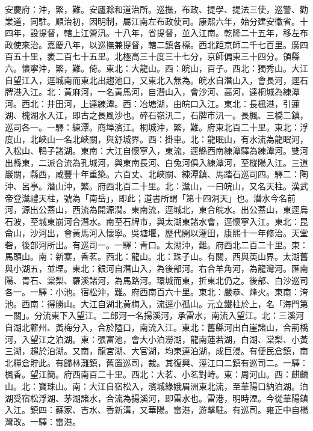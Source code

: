 \begin{pinyinscope}
安慶府：沖，繁，難。安廬滁和道治所。巡撫，布政、提學、提法三使，巡警、勸業道，同駐。順治初，因明制，屬江南左布政使司。康熙六年，始分建安徽省。十四年，設提督，轄上江營汛。十八年，省提督，並入江南。乾隆二十五年，移左布政使來治。嘉慶八年，以巡撫兼提督，轄二鎮各標。西北距京師二千七百里。廣四百五十里，袤二百七十五里。北極高三十度三十七分，京師偏東三十四分。領縣六。懷寧沖，繁，難。倚。東北：大龍山。西：皖山，百子。西北：獨秀山。大江自望江入，逕城南而東北出趨池口，又東北入無為。皖水自潛山入，會長河，逕石牌港入江。北：黃麻河，一名黃馬河，自潛山入，會沙河、高河，達桐城為練潭河。西北：井田河，上達練潭。西：冶塘湖，由皖口入江。東北：長楓港，引蓮湖、槐湖水入江，即古之長風沙也。碎石嶺汛二，石牌市汛一。長楓、三橋二鎮，巡司各一。一驛：練潭。商埠濱江。桐城沖，繁，難。府東北百二十里。東北：浮度山，北峽山一名北峽關，與舒城界。西：掛車。北：龍眠山，有水流為龍眠河，入松山、鴨子諸湖。東南：大江自懷寧入，東流，逕縣西南練潭驛為練潭河。雙河出縣東，二派合流為孔城河，與東南長河、白兔河俱入練潭河，至樅陽入江。三道巖關，縣西，咸豐十年重築。六百丈、北峽關、練潭鎮、馬踏石巡司四。驛二：陶沖、呂亭。潛山沖，繁。府西北百二十里。北：灊山，一曰皖山，又名天柱。漢武帝登灊禮天柱，號為「南岳」，即此；道書所謂「第十四洞天」也。潛水今名前河，源出公蓋山，西流為開源澗。東南流，逕城北，東合皖水。出公蓋山，東逕烏石波，至城東崩河合潛水。南至石牌市，與太湖東諸水會，逕懷寧入江。東北：昆侖山，沙河出，會黃馬河入懷寧。吳塘堰，歷代開以灌田，康熙十一年修治。天堂砦，後部河所出。有巡司一。一驛：青口。太湖沖，難。府西北二百二十里。東：馬頭山。南：新寨，香茗。西北：龍山。北：珠子山。有關，西與英山界。太湖舊與小湖五，並堙。東北：銀河自潛山入，為後部河。右合羊角河，為龍灣河。匯南陽、青石、棠梨、羅溪諸河，為馬路河。環城而東，折東北仍之。後部、白沙巡司各一。一驛：小池。宿松沖，難。府西南百六十里。東北：嚴恭、烽火。東南：洿池。西南：得勝山。大江自湖北黃梅入，流逕小孤山。元立鐵柱於上，名「海門第一關」。分流東下入望江。二郎河一名揚溪河，承雷水，南流入望江。北：三溪河自湖北蘄州、黃梅分入，合於隘口，南流入江。東北：舊縣河出白崖諸山，合荊橋河，入望江之泊湖。東：張富池，會大小泊澇湖，龍南蓮若湖，白湖、棠梨、小黃三湖，趨於泊湖。又南，龍宮湖、大官湖，均東連泊湖，成巨浸。有便民倉鎮，南北糧倉貯此。有歸林灘鎮，舊置巡司，裁。其復興、涇江口二鎮有巡司二。一驛：楓香。望江簡。府西南百二十里。西北：大茗、小茗對峙。東：周河山。西：麒麟山。北：寶珠山。南：大江自宿松入，濱城緣娥眉洲東北流，至華陽口納泊湖。泊湖受宿松浮湖、茅湖諸水，合流為揚溪河，即雷水也。雷港，明時湮。今從華陽鎮入江。鎮四：蘇家、吉水、香新溝，又華陽。雷港，游擊駐。有巡司。雍正中自楊灣改。一驛：雷港。


\end{pinyinscope}

